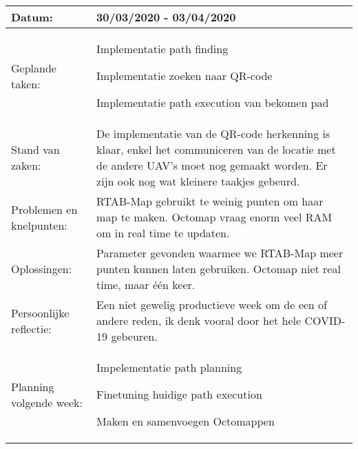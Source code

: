 \begin{tabularx}{\textwidth}{| l | X |}
    \hline
    Datum: & 30/03/2020 - 03/04/2020\\
    \hline
    Geplande taken: &
    \begin{compactitem}
      \item Implementatie path finding
      \item Implementatie zoeken naar QR-code
      \item Implementatie path execution van bekomen pad
    \end{compactitem}\\
    \hline
    Stand van zaken: & De implementatie van de QR-code herkenning is klaar, enkel het communiceren van de locatie met de andere UAV's moet nog gemaakt worden. Er zijn ook nog wat kleinere taakjes gebeurd.\\
    \hline
    Problemen en knelpunten: & RTAB-Map gebruikt te weinig punten om haar map te maken. Octomap vraag enorm veel RAM om in real time te updaten.\\
    \hline
    Oplossingen: & Parameter gevonden waarmee we RTAB-Map meer punten kunnen laten gebruiken. Octomap niet real time, maar \'e\'en keer.\\
    \hline
    Persoonlijke reflectie: & Een niet gewelig productieve week om de een of andere reden, ik denk vooral door het hele COVID-19 gebeuren.\\
    \hline
    Planning volgende week: &
    \begin{compactitem}
      \item Impelementatie path planning
      \item Finetuning huidige path execution
      \item Maken en samenvoegen Octomappen
    \end{compactitem}\\
    \hline
  \end{tabularx}